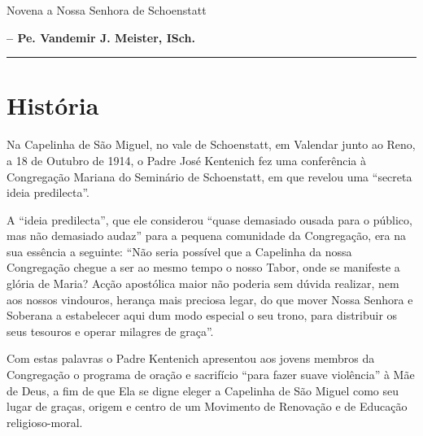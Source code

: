 \documentclass[a4paper,14pt]{extarticle} \usepackage[utf8]{inputenc}
\begin{document}
\begin{center}
  {\huge Novena a Nossa Senhora de Schoenstatt}
\end{center}


\textbf{-- Pe. Vandemir J. Meister, ISch.}

\par\noindent\rule{\textwidth}{0.4pt}

\tableofcontents
\thispagestyle{empty}

\newpage

\section{História}

Na Capelinha de São Miguel, no vale de Schoenstatt, em Valendar junto ao Reno, a 18 de Outubro de 1914, o Padre José Kentenich fez uma conferência à Congregação Mariana do Seminário de Schoenstatt, em que revelou uma “secreta ideia predilecta”.

A “ideia predilecta”, que ele considerou “quase demasiado ousada para o público, mas não demasiado audaz” para a pequena comunidade da Congregação, era na sua essência a seguinte: “Não seria possível que a Capelinha da nossa Congregação chegue a ser ao mesmo tempo o nosso Tabor, onde se manifeste a glória de Maria? Acção apostólica maior não poderia sem dúvida realizar, nem aos nossos vindouros, herança mais preciosa legar, do que mover Nossa Senhora e Soberana a estabelecer aqui dum modo especial o seu trono, para distribuir os seus tesouros e operar milagres de graça”.

Com estas palavras o Padre Kentenich apresentou aos jovens membros da Congregação o programa de oração e sacrifício “para fazer suave violência” à Mãe de Deus, a fim de que Ela se digne eleger a Capelinha de São Miguel como seu lugar de graças, origem e centro de um Movimento de Renovação e de Educação religioso-moral.
\end{document}
